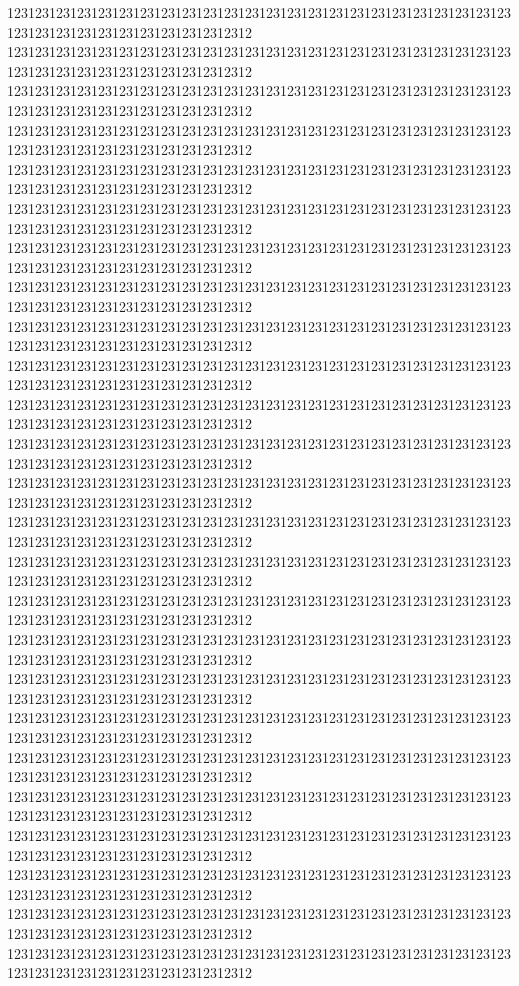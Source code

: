 \documentclass[11pt]{ctexbook}
\begin{document}
12312312312312312312312312312312312312312312312312312312312312312312312312312312312312312312312312312312312
12312312312312312312312312312312312312312312312312312312312312312312312312312312312312312312312312312312312
12312312312312312312312312312312312312312312312312312312312312312312312312312312312312312312312312312312312
12312312312312312312312312312312312312312312312312312312312312312312312312312312312312312312312312312312312
12312312312312312312312312312312312312312312312312312312312312312312312312312312312312312312312312312312312
12312312312312312312312312312312312312312312312312312312312312312312312312312312312312312312312312312312312
12312312312312312312312312312312312312312312312312312312312312312312312312312312312312312312312312312312312
12312312312312312312312312312312312312312312312312312312312312312312312312312312312312312312312312312312312
12312312312312312312312312312312312312312312312312312312312312312312312312312312312312312312312312312312312
12312312312312312312312312312312312312312312312312312312312312312312312312312312312312312312312312312312312
12312312312312312312312312312312312312312312312312312312312312312312312312312312312312312312312312312312312
12312312312312312312312312312312312312312312312312312312312312312312312312312312312312312312312312312312312
12312312312312312312312312312312312312312312312312312312312312312312312312312312312312312312312312312312312
12312312312312312312312312312312312312312312312312312312312312312312312312312312312312312312312312312312312
12312312312312312312312312312312312312312312312312312312312312312312312312312312312312312312312312312312312
12312312312312312312312312312312312312312312312312312312312312312312312312312312312312312312312312312312312
12312312312312312312312312312312312312312312312312312312312312312312312312312312312312312312312312312312312
12312312312312312312312312312312312312312312312312312312312312312312312312312312312312312312312312312312312
12312312312312312312312312312312312312312312312312312312312312312312312312312312312312312312312312312312312
12312312312312312312312312312312312312312312312312312312312312312312312312312312312312312312312312312312312
12312312312312312312312312312312312312312312312312312312312312312312312312312312312312312312312312312312312
12312312312312312312312312312312312312312312312312312312312312312312312312312312312312312312312312312312312
12312312312312312312312312312312312312312312312312312312312312312312312312312312312312312312312312312312312
12312312312312312312312312312312312312312312312312312312312312312312312312312312312312312312312312312312312
12312312312312312312312312312312312312312312312312312312312312312312312312312312312312312312312312312312312
\end{document}
